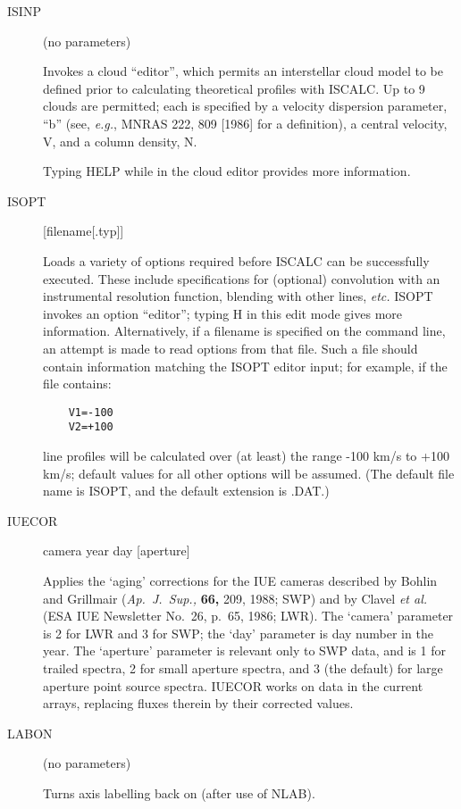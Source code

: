 \begin {description}
\item [ISINP] (no parameters)

Invokes a cloud ``editor'', which permits an interstellar cloud model
to be defined prior to calculating theoretical profiles with ISCALC.
Up to 9 clouds are permitted;  each is specified by a velocity
dispersion parameter, ``b'' (see, {\em e.g.}, MNRAS 222, 809 [1986]
for a definition), a central velocity, V, and a column density, N.

Typing HELP while in the cloud editor provides more information.

\item [ISOPT] [filename[.typ]]

Loads a variety of options required before ISCALC can be successfully
executed. These include specifications for (optional) convolution with
an instrumental resolution function, blending with other lines, {\em
etc.} ISOPT invokes an option ``editor'';  typing H in this edit mode
gives more information. Alternatively, if a filename is specified on
the command line, an attempt is made to read options from that file.
Such a file should contain information matching the ISOPT editor
input;  for example, if the file contains:

\begin{verbatim}
    V1=-100
    V2=+100
\end{verbatim}

line profiles will be calculated over (at least) the range -100 km/s
to +100 km/s;  default values for all other options will be assumed.
(The default file name is ISOPT, and the default extension is .DAT.)

\item [IUECOR] camera year day [aperture]

Applies the `aging' corrections for the IUE cameras described by
Bohlin and Grillmair ({\it Ap.~J.~Sup.,} {\bf 66,} 209, 1988;  SWP)
and by Clavel {\it et al.} (ESA IUE Newsletter No.~26, p.~65, 1986; 
LWR). The `camera' parameter is 2 for LWR and 3 for SWP;  the `day'
parameter is day number in the year.   The `aperture' parameter  is
relevant only to SWP data, and is 1 for trailed spectra, 2 for small
aperture spectra, and 3 (the default) for large aperture point source
spectra.   IUECOR works on data in the current arrays, replacing
fluxes therein by their corrected values.

\item [LABON] (no parameters)

Turns axis labelling back on (after use of NLAB).


\end{description}
